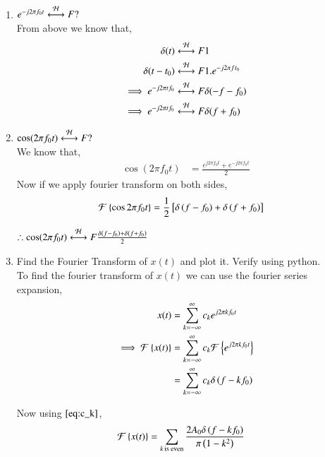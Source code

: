 \documentclass[journal,12pt,twocolumn]{IEEEtran}
\renewcommand\thesection{\arabic{section}}
\begin{document}
\begin{enumerate}[label=\thesection.\arabic*
,ref=\thesection.\theenumi]
    So, 
     \begin{align}
	\delta(t)\system{F} &= \int_{-\infty}^{\infty}\delta(t)e^{-j 2 \pi ft}dt \\
	                    &= e^{-\j 2 \pi ft}\vert_{t = 0} \\
			    &= 1
     \end{align}
 \item $e^{-j2\pi f_0t}\overset{\mathcal{H}}{ \longleftrightarrow}{F}?$\\
  \solution From above we know that,
    \begin{align}
	    \delta(t) &\overset{\mathcal{H}}{ \longleftrightarrow}{F} 1 \\
            \delta(t-t_0) &\overset{\mathcal{H}}{ \longleftrightarrow}{F} 1.e^{-j 2 \pi ft_0}\\
	    \implies e^{-j 2 \pi tf_0} &\overset{\mathcal{H}}{ \longleftrightarrow}{F} \delta(-f-f_0) \\
	    \implies e^{- j 2\pi tf_0} & \overset{\mathcal{H}}{ \longleftrightarrow}{F} \delta(f + f_0)
    \end{align}
 \item $\cos(2\pi f_0t)\overset{\mathcal{H}}{ \longleftrightarrow}{F}?$\\
  \solution We know that,
   \begin{align}
	   \cos(2 \pi f_0t) &= \frac{e^{j 2 \pi f_0t} + e^{ -j 2 \pi f_0t}}{2}
   \end{align}
   Now if we apply fourier transform on both sides,
    \begin{align}
	    \mathcal{F}\left\{\cos 2 \pi f_0t\right\} &= \frac{1}{2} {}\left[ \delta\left(f - f_0\right) + \delta\left(f + f_0\right)\right]
    \end{align}

    $\therefore \cos(2 \pi f_0t) \overset{\mathcal{H}}{ \longleftrightarrow}{F} \frac{ \delta\left(f - f_0\right) + \delta\left(f + f_0\right)}{2}$
 \item Find the Fourier Transform of $x(t)$ and plot it.  Verify using python.\\
  \solution To find the fourier transform of $x(t)$ we can use the fourier series expansion,
    \begin{align}
	    x(t) &= \sum_{k = -\infty}^{\infty}c_ke^{j 2 \pi kf_0t} \\
	    \implies \mathcal{F}\left\{x(t)\right\} &= \sum_{k = -\infty}^{\infty}c_k \mathcal{F}\left\{e^{j 2 \pi kf_0t}\right\}\\
					 &= \sum_{k = -\infty}^{\infty}c_k \delta\left(f - kf_0\right)
    \end{align}

    Now using $\eqref{eq:c_k}$, 
      \begin{align}
	      \mathcal{F}\left\{x(t)\right\} &= \sum_{ k \, \text{is even}}\frac{2A_0\delta\left(f-kf_0\right)}{\pi\left(1 - k^2\right)} 
      \end{align}


\end{enumerate}
\end{document}
